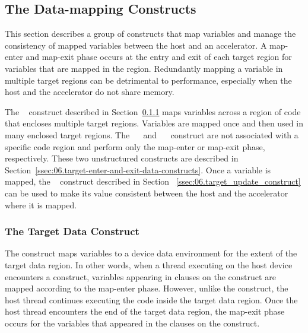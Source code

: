 \subsection{The Data-mapping Constructs}
\label{sec:06.data_mapping_constructs}

This section describes a group of constructs that map variables and manage the
consistency of mapped variables between the host and an accelerator.  A
map-enter and map-exit phase occurs at the entry and exit of each target region
for variables that are mapped in the region.  Redundantly mapping a variable in
multiple target regions can be detrimental to performance, especially when the
host and the accelerator do not share memory.

The ~ construct described in
Section~\ref{ssec:06.target_data_construct} maps variables across a region of
code that encloses multiple target regions.  Variables are mapped once and then
used in many enclosed target regions.  The
~~ and
~~ construct are not associated with a
specific code region and perform only the map-enter or map-exit phase,
respectively.  These two unstructured constructs are described in
Section~\ref{ssec:06.target-enter-and-exit-data-constructs}.  Once a variable
is mapped, the ~ construct described in Section~
\ref{ssec:06.target_update_construct} can be used to make its value consistent
between the host and the accelerator where it is mapped.


\subsubsection{The Target Data Construct}
\label{ssec:06.target_data_construct}

The  construct maps variables to a device data environment
for the extent of the target data region.  In other words, when a thread
executing on the host device encounters a  construct,
variables appearing in  clauses on the construct are mapped according
to the map-enter phase.  However, unlike the  construct, the host
thread continues executing the code inside the target data region.  Once the
host thread encounters the end of the target data region, the map-exit phase
occurs for the variables that appeared in the  clauses on the
construct. 

